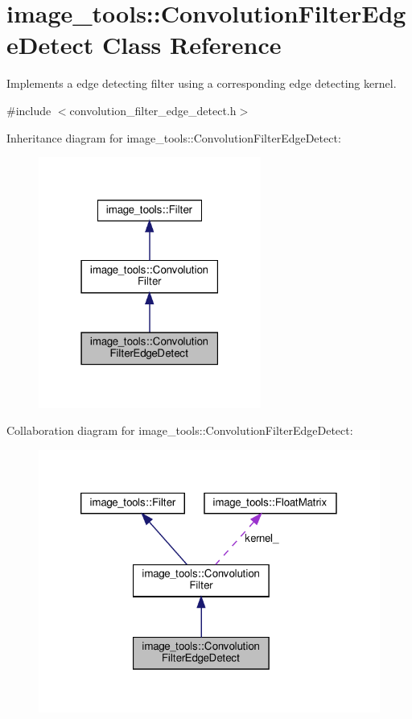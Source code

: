 \hypertarget{classimage__tools_1_1ConvolutionFilterEdgeDetect}{}\section{image\+\_\+tools\+:\+:Convolution\+Filter\+Edge\+Detect Class Reference}
\label{classimage__tools_1_1ConvolutionFilterEdgeDetect}


Implements a edge detecting filter using a corresponding edge detecting kernel.  




{\ttfamily \#include $<$convolution\+\_\+filter\+\_\+edge\+\_\+detect.\+h$>$}



Inheritance diagram for image\+\_\+tools\+:\+:Convolution\+Filter\+Edge\+Detect\+:
\nopagebreak
\begin{figure}[H]
\begin{center}
\leavevmode
\includegraphics[width=207pt]{classimage__tools_1_1ConvolutionFilterEdgeDetect__inherit__graph}
\end{center}
\end{figure}


Collaboration diagram for image\+\_\+tools\+:\+:Convolution\+Filter\+Edge\+Detect\+:
\nopagebreak
\begin{figure}[H]
\begin{center}
\leavevmode
\includegraphics[width=320pt]{classimage__tools_1_1ConvolutionFilterEdgeDetect__coll__graph}
\end{center}
\end{figure}
